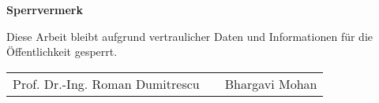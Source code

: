 \thispagestyle{empty}    %
\vspace*{8cm}
\fontsize{16pt}{18pt}\selectfont
\begin{center}
\sffamily
\bfseries
Sperrvermerk 
\vspace*{1cm}

Diese Arbeit bleibt aufgrund vertraulicher Daten und Informationen f\"ur die \"Offentlichkeit gesperrt.
\end{center}
\vspace*{7.5cm}
\normalsize
\sffamily
	\begin{center}
		\begin{tabular}{l l r}
		  \cline{1-1} \cline{3-3}
		  \begin{minipage}[t]{0.5\textwidth}
		    \centering
		    Prof. Dr.-Ing. Roman Dumitrescu
			\end{minipage}
			&
			\begin{minipage}[t]{0\textwidth}
			\end{minipage}
			&
			\begin{minipage}[t]{0.5\textwidth}
			  \centering
			  Bhargavi Mohan
			\end{minipage}
		\end{tabular}
	\end{center}
\cleardoublepage